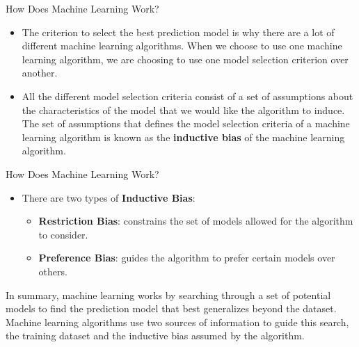 \documentclass[aspectratio=169,xcolor=dvipsnames]{beamer}
\begin{document}


\begin{frame}{How Does Machine Learning Work?}
\begin{itemize}
\setlength{\itemsep}{.5cm}

\item The criterion to select the best prediction model is why there are a lot of different machine learning algorithms. When we choose to use one machine learning algorithm, we are choosing to use one model selection criterion over another.

\item All the different model selection criteria consist of a set of assumptions about the characteristics of the model that we would like the algorithm to induce. The set of assumptions that defines the model selection criteria of a machine learning algorithm is
known as the \textbf{inductive bias} of the machine learning algorithm.

\end{itemize}
\end{frame}



\begin{frame}{How Does Machine Learning Work?}
\begin{itemize}
\setlength{\itemsep}{.5cm}

\item There are two types of \textbf{Inductive Bias}:
	\begin{itemize}
	\item \textbf{Restriction Bias}: constrains the set of models allowed for the algorithm to consider.
	\item \textbf{Preference Bias}: guides the algorithm to prefer certain models over others.
	\end{itemize}
\end{itemize}
\vspace{.5cm}
In summary, machine learning works by searching through a set of potential models to find the prediction model that best generalizes beyond the dataset. Machine learning algorithms use two sources of information to guide this search, the training dataset and the inductive bias assumed by the algorithm.

\end{frame}

\end{document}
